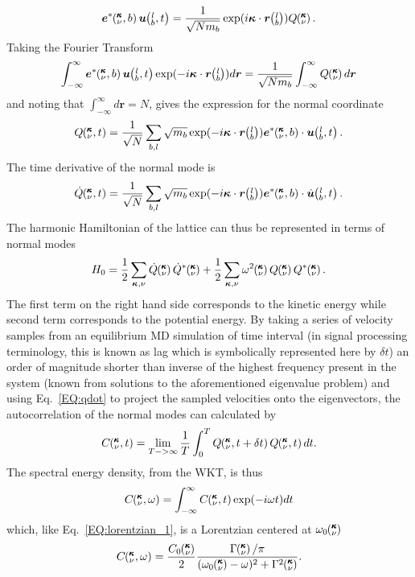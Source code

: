 %
\begin{equation}
\bm{e}^*\kvb\bm{u}\lbt=\frac{1}{\sqrt{Nm_b}}\exp(i\bm{\kappa}\cdot\bm{r}\lb)Q\kv.
\end{equation}
%
Taking the Fourier Transform
%
\begin{equation}
\int_{-\infty}^{\infty}\bm{e}^*\kvb\bm{u}\lbt \exp(-i\bm{\kappa}\cdot\bm{r}\lb)d\bm{r}=\frac{1}{\sqrt{Nm_b}}\int_{-\infty}^{\infty}Q\kv d\bm{r}
\end{equation}
%
and noting that $\int_{-\infty}^{\infty}d\bm{r}=N$, gives the expression for the normal coordinate
%
\begin{equation}
Q\kvt=\frac{1}{\sqrt{N}}\sum_{b,l}\sqrt{m_b}\exp(-i\bm{\kappa}\cdot\bm{r}\lb)\bm{e}^*\kvb\cdot\bm{u}\lbt.
\end{equation}
%
The time derivative of the normal mode is
%
\begin{equation}\label{EQ:qdot}
\dot{Q}\kvt=\frac{1}{\sqrt{N}}\sum_{b,l}\sqrt{m_b}\exp(-i\bm{\kappa}\cdot\bm{r}\lb)\bm{e}^*\kvb\cdot\dot{\bm{u}}\lbt.
\end{equation}
%
The harmonic Hamiltonian of the lattice can thus be represented in terms of normal modes
%
\begin{equation}
H_0=\frac{1}{2}\sum_{\bm{\kappa},\nu}\dot{Q}\kv\dot{Q}^*\kv+\frac{1}{2}\sum_{\bm{\kappa},\nu}\omega^2\kv Q\kv Q^*\kv.
\end{equation}
%
The first term on the right hand side corresponds to the kinetic energy while second term corresponds to the potential energy. By taking a series of velocity samples from an equilibrium MD simulation of time interval (in signal processing terminology, this is known as lag which is symbolically represented here by $\delta t$) an order of magnitude shorter than inverse of the highest frequency present in the system (known from solutions to the aforementioned eigenvalue problem) and using Eq.~\ref{EQ:qdot} to project the sampled velocities onto the eigenvectors, the autocorrelation of the normal modes can calculated by
%
\begin{equation}\label{EQ:corrqdot}
C\kvt=\lim_{T->\infty}\frac{1}{T}\int_{0}^{T}Q\kvtt Q\kvt dt.
\end{equation}
%
The spectral energy density, from the WKT, is thus
%
\begin{equation}
C\mspace{-4.0mu}\left(\mspace{-8.0mu} \begin{smallmatrix}&\pmb{\kappa} \\&\nu\end{smallmatrix} \mspace{-2.0mu},\omega\right)=\int_{-\infty}^{\infty}C\mspace{-4.0mu}\left(\mspace{-8.0mu} \begin{smallmatrix}&\pmb{\kappa} \\&\nu\end{smallmatrix} \mspace{-2.0mu},t\right) \exp(-i\omega t)dt
\end{equation}
%
which, like Eq.~\ref{EQ:lorentzian_1}, is a Lorentzian centered at $\omega_0\mspace{-4.0mu}\left(\mspace{-8.0mu} \begin{smallmatrix}&\pmb{\kappa} \\&\nu\end{smallmatrix} \mspace{-3.0mu}\right)$
%
\begin{equation}\label{EQ:corromega}
C\kvw=\frac{C_0\kv}{2}\frac{\Gamma\kv/\pi}{(\omega_0\kv-\omega)^2+\Gamma^2\kv}.
\end{equation}
